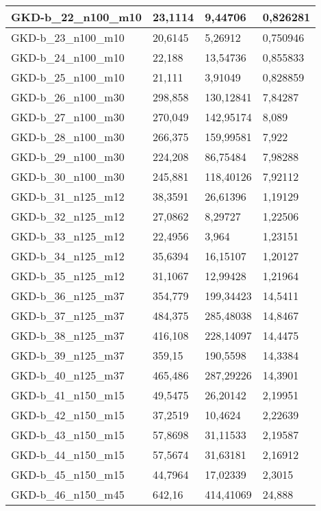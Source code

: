 \begin{table}[!ht]
\begin{adjustbox}{height=12cm}
\begin{tabular}{|l|l|l|l|}
		GKD-b\_22\_n100\_m10 & 23,1114 & 9,44706   & 0,826281  \\ \hline
		GKD-b\_23\_n100\_m10 & 20,6145 & 5,26912   & 0,750946  \\ \hline
		GKD-b\_24\_n100\_m10 & 22,188  & 13,54736  & 0,855833  \\ \hline
		GKD-b\_25\_n100\_m10 & 21,111  & 3,91049   & 0,828859  \\ \hline
		GKD-b\_26\_n100\_m30 & 298,858 & 130,12841 & 7,84287   \\ \hline
		GKD-b\_27\_n100\_m30 & 270,049 & 142,95174 & 8,089     \\ \hline
		GKD-b\_28\_n100\_m30 & 266,375 & 159,99581 & 7,922     \\ \hline
		GKD-b\_29\_n100\_m30 & 224,208 & 86,75484  & 7,98288   \\ \hline
		GKD-b\_30\_n100\_m30 & 245,881 & 118,40126 & 7,92112   \\ \hline
		GKD-b\_31\_n125\_m12 & 38,3591 & 26,61396  & 1,19129   \\ \hline
		GKD-b\_32\_n125\_m12 & 27,0862 & 8,29727   & 1,22506   \\ \hline
		GKD-b\_33\_n125\_m12 & 22,4956 & 3,964     & 1,23151   \\ \hline
		GKD-b\_34\_n125\_m12 & 35,6394 & 16,15107  & 1,20127   \\ \hline
		GKD-b\_35\_n125\_m12 & 31,1067 & 12,99428  & 1,21964   \\ \hline
		GKD-b\_36\_n125\_m37 & 354,779 & 199,34423 & 14,5411   \\ \hline
		GKD-b\_37\_n125\_m37 & 484,375 & 285,48038 & 14,8467   \\ \hline
		GKD-b\_38\_n125\_m37 & 416,108 & 228,14097 & 14,4475   \\ \hline
		GKD-b\_39\_n125\_m37 & 359,15  & 190,5598  & 14,3384   \\ \hline
		GKD-b\_40\_n125\_m37 & 465,486 & 287,29226 & 14,3901   \\ \hline
		GKD-b\_41\_n150\_m15 & 49,5475 & 26,20142  & 2,19951   \\ \hline
		GKD-b\_42\_n150\_m15 & 37,2519 & 10,4624   & 2,22639   \\ \hline
		GKD-b\_43\_n150\_m15 & 57,8698 & 31,11533  & 2,19587   \\ \hline
		GKD-b\_44\_n150\_m15 & 57,5674 & 31,63181  & 2,16912   \\ \hline
		GKD-b\_45\_n150\_m15 & 44,7964 & 17,02339  & 2,3015    \\ \hline
		GKD-b\_46\_n150\_m45 & 642,16  & 414,41069 & 24,888    \\ \hline

\end{tabular}
\end{adjustbox}
\end{table}
